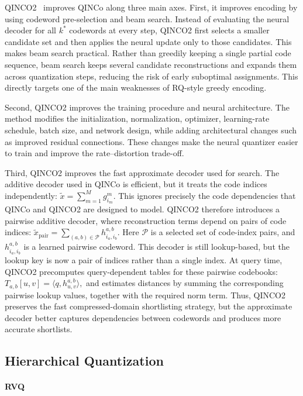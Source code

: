\documentclass[sigconf]{acmart}
\begin{document}
QINCO2~\cite{qinco2} improves QINCo along three main axes. 
First, it improves encoding by using codeword pre-selection and beam search. 
Instead of evaluating the neural decoder for all $k^{*}$ codewords at every step, QINCO2 first selects a smaller candidate set and then applies the neural update only to those candidates. 
This makes beam search practical. 
Rather than greedily keeping a single partial code sequence, beam search keeps several candidate reconstructions and expands them across quantization steps, reducing the risk of early suboptimal assignments. 
This directly targets one of the main weaknesses of RQ-style greedy encoding.

Second, QINCO2 improves the training procedure and neural architecture. 
The method modifies the initialization, normalization, optimizer, learning-rate schedule, batch size, and network design, while adding architectural changes such as improved residual connections. 
These changes make the neural quantizer easier to train and improve the rate--distortion trade-off.

Third, QINCO2 improves the fast approximate decoder used for search. 
The additive decoder used in QINCo is efficient, but it treats the code indices independently:
\(
\tilde{x}
=
\sum_{m=1}^{M} g^m_{i_m}.
\)
This ignores precisely the code dependencies that QINCo and QINCO2 are designed to model. 
QINCO2 therefore introduces a pairwise additive decoder, where reconstruction terms depend on pairs of code indices:
\(
\tilde{x}_{\mathrm{pair}}
=
\sum_{(a,b)\in \mathcal{P}}
h^{a,b}_{i_a,i_b}.
\)
Here $\mathcal{P}$ is a selected set of code-index pairs, and $h^{a,b}_{i_a,i_b}$ is a learned pairwise codeword. 
This decoder is still lookup-based, but the lookup key is now a pair of indices rather than a single index. 
At query time, QINCO2 precomputes query-dependent tables for these pairwise codebooks:
\(
T_{a,b}[u,v]
=
\langle q,h^{a,b}_{u,v}\rangle,
\)
and estimates distances by summing the corresponding pairwise lookup values, together with the required norm term. 
Thus, QINCO2 preserves the fast compressed-domain shortlisting strategy, but the approximate decoder better captures dependencies between codewords and produces more accurate shortlists.

\subsection{Hierarchical Quantization}
\paragraph{RVQ~\cite{rvq}}
\end{document}
